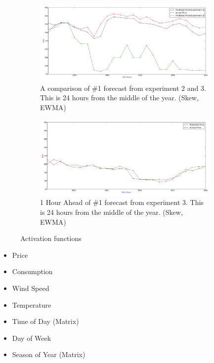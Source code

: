 \begin{figure}[H]
\centering
\begin{subfigure}{.45\textwidth}
  \centering
	\includegraphics[width=\linewidth,natwidth=898,natheight=587]{billeder/PriceExperimentalAnalysis/X2_X3_3816_3840.png}
	\caption{A comparison of \#1 forecast from experiment 2 and 3. This is 24 hours from the middle of the year. (Skew, EWMA)}
	\label{fig:X2_X3_3816_3840}
\end{subfigure}%
\begin{subfigure}{.45\textwidth}
  \centering
	\includegraphics[width=\linewidth,natwidth=898,natheight=587]{billeder/PriceExperimentalAnalysis/X2_X3_3816_3840_1hourAhead.png}
	\caption{1 Hour Ahead of \#1 forecast from experiment 3. This is 24 hours from the middle of the year. (Skew, EWMA)}
	\label{fig:X2_X3_3816_3840}
\end{subfigure}
\caption{Activation functions}
\label{fig:test}
\end{figure}

\begin{itemize}
	\item Price
	\item Consumption
	\item Wind Speed
	\item Temperature
	\item Time of Day (Matrix)
	\item Day of Week
	\item Season of Year (Matrix)
\end{itemize}

